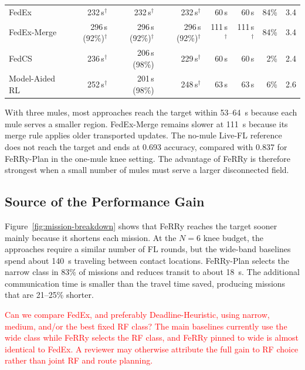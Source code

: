\documentclass[conference]{IEEEtran}
\newcommand{\sysname}{FeRRy}
\begin{document}
\begin{table}[h]
{\begin{tabular}{l rrr rr rr}
FedEx
& 232\,s$^{\dagger}$ & 232\,s$^{\dagger}$
& 232\,s$^{\dagger}$ & 60\,s & 60\,s & 84\% & 3.4 \\

FedEx-Merge
& 296\,s {\scriptsize(92\%)}$^{\dagger}$
& 296\,s {\scriptsize(92\%)}$^{\dagger}$
& 296\,s {\scriptsize(92\%)}$^{\dagger}$
& 111\,s$^{\dagger}$ & 111\,s$^{\dagger}$ & 84\% & 3.4 \\

FedCS
& 236\,s$^{\dagger}$ & 206\,s {\scriptsize(98\%)}
& 229\,s$^{\dagger}$ & 60\,s & 60\,s & 2\% & 2.4 \\

Model-Aided RL
& 252\,s$^{\dagger}$ & 201\,s {\scriptsize(98\%)}
& 248\,s$^{\dagger}$ & 63\,s & 63\,s & 6\% & 2.6 \\
\bottomrule
\end{tabular}%
}
\end{table}

With three mules, most approaches reach the target within 53--64~s because each
mule serves a smaller region. FedEx-Merge remains slower at 111~s because its
merge rule applies older transported updates. The no-mule Live-FL reference
does not reach the target and ends at 0.693 accuracy, compared with 0.837 for
\sysname{}-Plan in the one-mule knee setting. The advantage of \sysname{} is
therefore strongest when a small number of mules must serve a larger
disconnected field.

\subsection{Source of the Performance Gain}
\label{sec:source-gain}

Figure~\ref{fig:mission-breakdown} shows that \sysname{} reaches the target
sooner mainly because it shortens each mission. At the \(N=6\) knee budget, the
approaches require a similar number of FL rounds, but the wide-band baselines
spend about 140~s traveling between contact locations. \sysname{}-Plan selects
the narrow class in 83\% of missions and reduces transit to about 18~s. The
additional communication time is smaller than the travel time saved, producing
missions that are 21--25\% shorter.

\textcolor{red}{Can we compare FedEx, and preferably Deadline-Heuristic, using narrow, medium, and/or the best fixed RF class? The main baselines currently use the wide class while FeRRy selects the RF class, and FeRRy pinned to wide is almost identical to FedEx. A reviewer may otherwise attribute the full gain to RF choice rather than joint RF and route planning.}
\end{document}
